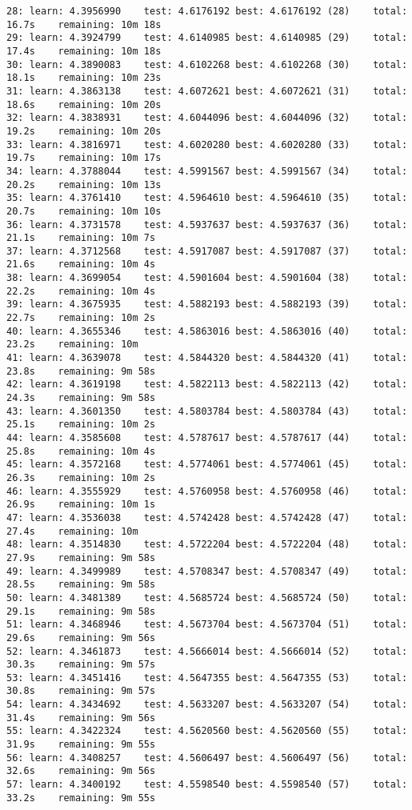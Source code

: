 \documentclass[11pt]{article}
\begin{document}
\begin{Verbatim}[commandchars=\\\{\}]
28:	learn: 4.3956990	test: 4.6176192	best: 4.6176192 (28)	total: 16.7s	remaining: 10m 18s
29:	learn: 4.3924799	test: 4.6140985	best: 4.6140985 (29)	total: 17.4s	remaining: 10m 18s
30:	learn: 4.3890083	test: 4.6102268	best: 4.6102268 (30)	total: 18.1s	remaining: 10m 23s
31:	learn: 4.3863138	test: 4.6072621	best: 4.6072621 (31)	total: 18.6s	remaining: 10m 20s
32:	learn: 4.3838931	test: 4.6044096	best: 4.6044096 (32)	total: 19.2s	remaining: 10m 20s
33:	learn: 4.3816971	test: 4.6020280	best: 4.6020280 (33)	total: 19.7s	remaining: 10m 17s
34:	learn: 4.3788044	test: 4.5991567	best: 4.5991567 (34)	total: 20.2s	remaining: 10m 13s
35:	learn: 4.3761410	test: 4.5964610	best: 4.5964610 (35)	total: 20.7s	remaining: 10m 10s
36:	learn: 4.3731578	test: 4.5937637	best: 4.5937637 (36)	total: 21.1s	remaining: 10m 7s
37:	learn: 4.3712568	test: 4.5917087	best: 4.5917087 (37)	total: 21.6s	remaining: 10m 4s
38:	learn: 4.3699054	test: 4.5901604	best: 4.5901604 (38)	total: 22.2s	remaining: 10m 4s
39:	learn: 4.3675935	test: 4.5882193	best: 4.5882193 (39)	total: 22.7s	remaining: 10m 2s
40:	learn: 4.3655346	test: 4.5863016	best: 4.5863016 (40)	total: 23.2s	remaining: 10m
41:	learn: 4.3639078	test: 4.5844320	best: 4.5844320 (41)	total: 23.8s	remaining: 9m 58s
42:	learn: 4.3619198	test: 4.5822113	best: 4.5822113 (42)	total: 24.3s	remaining: 9m 58s
43:	learn: 4.3601350	test: 4.5803784	best: 4.5803784 (43)	total: 25.1s	remaining: 10m 2s
44:	learn: 4.3585608	test: 4.5787617	best: 4.5787617 (44)	total: 25.8s	remaining: 10m 4s
45:	learn: 4.3572168	test: 4.5774061	best: 4.5774061 (45)	total: 26.3s	remaining: 10m 2s
46:	learn: 4.3555929	test: 4.5760958	best: 4.5760958 (46)	total: 26.9s	remaining: 10m 1s
47:	learn: 4.3536038	test: 4.5742428	best: 4.5742428 (47)	total: 27.4s	remaining: 10m
48:	learn: 4.3514830	test: 4.5722204	best: 4.5722204 (48)	total: 27.9s	remaining: 9m 58s
49:	learn: 4.3499989	test: 4.5708347	best: 4.5708347 (49)	total: 28.5s	remaining: 9m 58s
50:	learn: 4.3481389	test: 4.5685724	best: 4.5685724 (50)	total: 29.1s	remaining: 9m 58s
51:	learn: 4.3468946	test: 4.5673704	best: 4.5673704 (51)	total: 29.6s	remaining: 9m 56s
52:	learn: 4.3461873	test: 4.5666014	best: 4.5666014 (52)	total: 30.3s	remaining: 9m 57s
53:	learn: 4.3451416	test: 4.5647355	best: 4.5647355 (53)	total: 30.8s	remaining: 9m 57s
54:	learn: 4.3434692	test: 4.5633207	best: 4.5633207 (54)	total: 31.4s	remaining: 9m 56s
55:	learn: 4.3422324	test: 4.5620560	best: 4.5620560 (55)	total: 31.9s	remaining: 9m 55s
56:	learn: 4.3408257	test: 4.5606497	best: 4.5606497 (56)	total: 32.6s	remaining: 9m 56s
57:	learn: 4.3400192	test: 4.5598540	best: 4.5598540 (57)	total: 33.2s	remaining: 9m 55s

\end{Verbatim}
\end{document}
